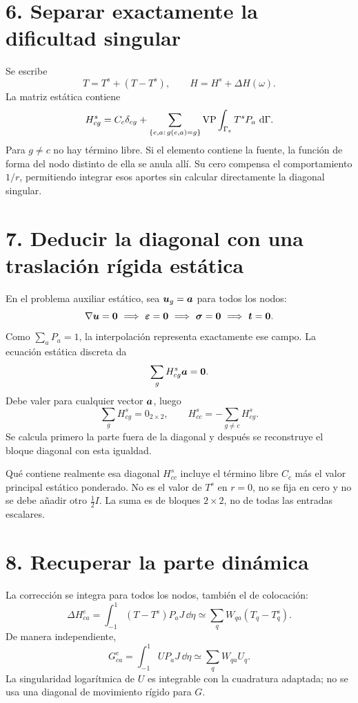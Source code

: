 \documentclass[11pt]{article}
\begin{document}
\newpage
\section*{6. Separar exactamente la dificultad singular}
Se escribe
\[
 T=T^s+(T-T^s),\qquad
 H=H^s+\Delta H(\omega).
\]
La matriz estática contiene
\[
 H^s_{cg}=C_c\delta_{cg}
 +\sum_{\{e,a:\,g(e,a)=g\}}\operatorname{VP}\int_{\Gamma_e}T^sP_a\,\,\mathrm{d}\Gamma.
\]
Para \(g\ne c\) no hay término libre. Si el elemento contiene la fuente,
la función de forma del nodo distinto de ella se anula allí.
Su cero compensa el comportamiento \(1/r\), permitiendo integrar esos
aportes sin calcular directamente la diagonal singular.

\section*{7. Deducir la diagonal con una traslación rígida estática}
En el problema auxiliar estático, sea
\(\bm{u}_g=\bm{a}\) para todos los nodos:
\[
 \nabla\bm{u}=\bm{0}
 \ \Longrightarrow\ \boldsymbol\varepsilon=\bm{0}
 \ \Longrightarrow\ \boldsymbol\sigma=\bm{0}
 \ \Longrightarrow\ \bm{t}=\bm{0}.
\]
Como \(\sum_aP_a=1\), la interpolación representa exactamente ese campo.
La ecuación estática discreta da
\[
 \sum_gH^s_{cg}\bm{a}=\bm{0}.
\]
Debe valer para cualquier vector \(\bm{a}\), luego
\[
 \boxed{\sum_gH^s_{cg}=0_{2\times2},\qquad
 H^s_{cc}=-\sum_{g\ne c}H^s_{cg}.}
\]
Se calcula primero la parte fuera de la diagonal y después se reconstruye
el bloque diagonal con esta igualdad.

\begin{alerta}{Qué contiene realmente esa diagonal}
\(H^s_{cc}\) incluye el término libre \(C_c\) más el valor principal estático
ponderado. No es el valor de \(T^s\) en \(r=0\), no se fija en cero y
no se debe añadir otro \(\tfrac12 I\).
La suma es de bloques \(2\times2\), no de todas las entradas escalares.
\end{alerta}

\newpage
\section*{8. Recuperar la parte dinámica}
La corrección se integra para todos los nodos, también el de colocación:
\[
 \Delta H^e_{ca}=
 \int_{-1}^{1}(T-T^s)P_aJ\,\dd\eta
 \simeq\sum_qW_{qa}(T_q-T_q^s).
\]
De manera independiente,
\[
 G^e_{ca}=\int_{-1}^{1}UP_aJ\,\dd\eta
 \simeq\sum_qW_{qa}U_q.
\]
La singularidad logarítmica de \(U\) es integrable con la cuadratura adaptada;
no se usa una diagonal de movimiento rígido para \(G\).
\end{document}
